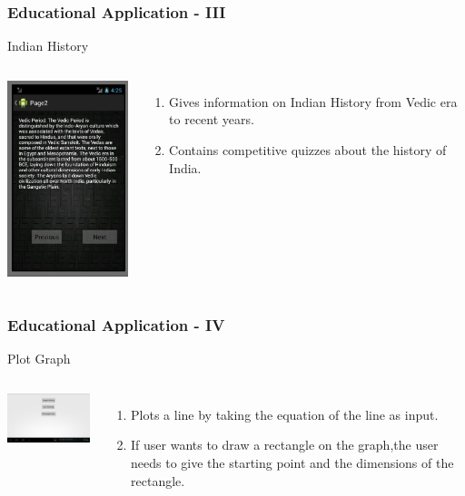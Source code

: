\documentclass[12pt]{beamer}
\begin{document}
\begin{frame}[c]
\frametitle{Educational Application - III}
\begin{block}{Indian History}
 \begin{columns}[c]
   \includegraphics[width=4.5cm]{./app4.jpg}
  \begin{enumerate}
  \item \vskip-20pt Gives information on Indian History from Vedic era to recent years. 
  \item Contains competitive quizzes about the history of India.
 \end{enumerate}
 \end{columns}
\end{block}
\end{frame}

\begin{frame}[c]
\frametitle{Educational Application - IV}
\begin{block}{Plot Graph}
 \begin{columns}[c]
   \includegraphics[width=5cm]{./app5.jpg}
  \begin{enumerate}
  \item \vskip-15pt Plots a line by taking the equation of the line as input.
  \item If user wants to draw a rectangle on the graph,the user needs to give the starting point and the dimensions of the rectangle. 
 
 \end{enumerate}
 \end{columns}
\end{block}
\end{frame}
\end{document}
